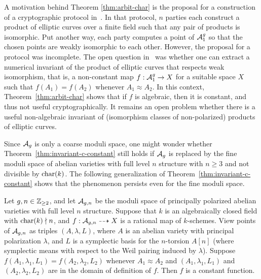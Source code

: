\documentclass{amsart}
\begin{document}
A motivation behind Theorem \ref{thm:arbit-char} is the proposal for a construction of a cryptographic protocol in~\cite{multiparty}. In that protocol, $n$ parties each construct a product of elliptic curves over a finite field such that any pair of products is isomorphic. Put another way, each party computes a point of $\mathcal{A}_1^g$ so that the chosen points are weakly isomorphic to each other. However, the proposal for a protocol was incomplete. The open question in~\cite{multiparty} was whether one can extract a numerical invariant of the product of elliptic curves that respects weak isomorphism, that is, a non-constant map $f: \mathcal{A}_1^g \to X$ for a suitable space $X$ such that $f(A_1) = f(A_2)$ whenever $A_1 \approx A_2$. In this context, Theorem~\ref{thm:arbit-char} shows that if $f$ is algebraic, then it is constant, and thus not useful cryptographically. It remains an open problem whether there is a useful non-algebraic invariant of (isomorphism classes of non-polarized) products of elliptic curves.


Since $\mathcal{A}_g$ is only a coarse moduli space, one might wonder whether Theorem~\ref{thm:invariant-c-constant} still holds if $\mathcal{A}_g$  is replaced by the fine moduli space of abelian varieties with full level $n$ structure with $n\ge 3$ and not divisible by $\operatorname{char}(k)$. The following generalization of
Theorem~\ref{thm:invariant-c-constant} shows that the phenomenon persists even for the fine moduli space.

\begin{corollary}\label{cor:agn}
  Let $g,n \in \mathbb{Z}_{\geq 2}$, and let $\mathcal{A}_{g,n}$ be the moduli space of principally polarized abelian varieties with full level $n$ structure. Suppose that $k$ is an algebraically closed field with $\operatorname{char}(k) \nmid n$,  and $f: \mathcal{A}_{g,n} \dashrightarrow X$ is a rational map of $k$-schemes. View points of $\mathcal{A}_{g,n}$ as triples  $(A, \lambda,L)$, where $A$ is an abelian variety with principal polarization $\lambda$, and $L$ is a symplectic basis for the $n$-torsion $A[n]$ (where symplectic means with respect to the Weil pairing induced by $\lambda$). Suppose $f(A_1,\lambda_1, L_1) = f(A_2,\lambda_2, L_2)$ whenever $A_1 \approx A_2$ and $(A_1,\lambda_1, L_1)$ and $(A_2,\lambda_2, L_2)$ are in the domain of definition of $f$. Then $f$ is a constant function.
\end{corollary}

\end{document}
